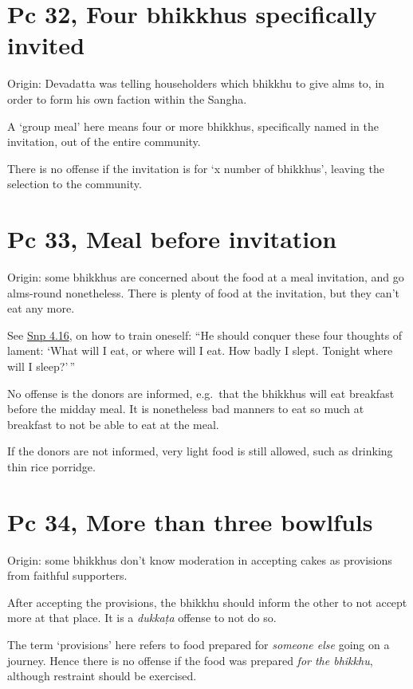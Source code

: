 \section{Pc 32, Four bhikkhus specifically invited}

Origin: Devadatta was telling householders which bhikkhu to give alms
to, in order to form his own faction within the Sangha.

A `group meal' here means four or more bhikkhus, specifically named in
the invitation, out of the entire community.

There is no offense if the invitation is for `x number of bhikkhus',
leaving the selection to the community.

\section{Pc 33, Meal before invitation}

Origin: some bhikkhus are concerned about the food at a meal invitation,
and go alms-round nonetheless. There is plenty of food at the
invitation, but they can't eat any more.

See
\href{https://www.accesstoinsight.org/tipitaka/kn/snp/snp.4.16.than.html}{Snp
4.16}, on how to train oneself: ``He should conquer these four thoughts
of lament: `What will I eat, or where will I eat. How badly I slept.
Tonight where will I sleep?'\,''

No offense is the donors are informed, e.g.~that the bhikkhus will eat
breakfast before the midday meal. It is nonetheless bad manners to eat
so much at breakfast to not be able to eat at the meal.

If the donors are not informed, very light food is still allowed, such
as drinking thin rice porridge.

\section{Pc 34, More than three bowlfuls}

Origin: some bhikkhus don't know moderation in accepting cakes as
provisions from faithful supporters.

\enlargethispage{\baselineskip}

After accepting the provisions, the bhikkhu should inform the other to
not accept more at that place. It is a \emph{dukkaṭa} offense to not do
so.

The term `provisions' here refers to food prepared for \emph{someone
else} going on a journey. Hence there is no offense if the food was
prepared \emph{for the bhikkhu}, although restraint should be exercised.

